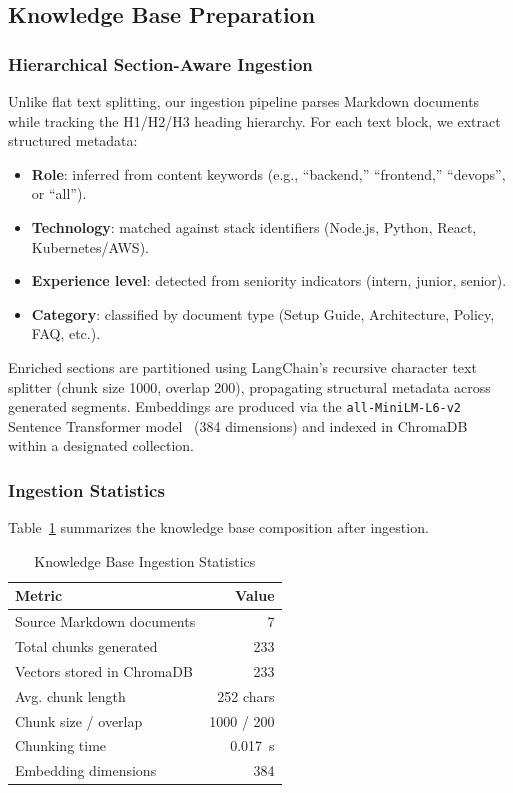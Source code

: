 \documentclass[conference]{IEEEtran}
\begin{document}
\subsection{Knowledge Base Preparation}

\subsubsection{Hierarchical Section-Aware Ingestion}
Unlike flat text splitting, our ingestion pipeline parses Markdown documents while tracking the H1/H2/H3 heading hierarchy. For each text block, we extract structured metadata:
\begin{itemize}
    \item \textbf{Role}: inferred from content keywords (e.g., ``backend,'' ``frontend,'' ``devops'', or ``all'').
    \item \textbf{Technology}: matched against stack identifiers (Node.js, Python, React, Kubernetes/AWS).
    \item \textbf{Experience level}: detected from seniority indicators (intern, junior, senior).
    \item \textbf{Category}: classified by document type (Setup Guide, Architecture, Policy, FAQ, etc.).
\end{itemize}

Enriched sections are partitioned using LangChain's recursive character text splitter (chunk size 1000, overlap 200), propagating structural metadata across generated segments. Embeddings are produced via the \texttt{all-MiniLM-L6-v2} Sentence Transformer model~\cite{reimers2019sentence} (384 dimensions) and indexed in ChromaDB~\cite{chromadb2024} within a designated collection.

\subsubsection{Ingestion Statistics}
Table~\ref{tab:ingestion} summarizes the knowledge base composition after ingestion.

\begin{table}[htbp]
\centering
\caption{Knowledge Base Ingestion Statistics}
\label{tab:ingestion}
\begin{tabular}{l r}
\toprule
\textbf{Metric} & \textbf{Value} \\
\midrule
Source Markdown documents & 7 \\
Total chunks generated & 233 \\
Vectors stored in ChromaDB & 233 \\
Avg. chunk length & 252 chars \\
Chunk size / overlap & 1000 / 200 \\
Chunking time & 0.017~s \\
Embedding dimensions & 384 \\
\bottomrule
\end{tabular}
\end{table}
\end{document}
